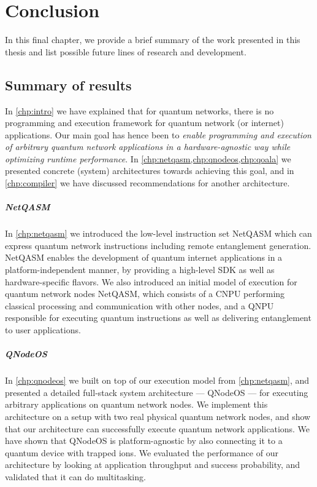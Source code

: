 \chapter{Conclusion}
\label{chp:conclusion}

In this final chapter, we provide a brief summary of the work presented in this thesis and list possible future lines of research and development.

\section{Summary of results}
In \cref{chp:intro} we have explained that for quantum networks, there is no programming and execution framework for quantum network (or internet) applications.
Our main goal has hence been to \emph{enable programming and execution of arbitrary quantum network applications in a hardware-agnostic way while optimizing runtime performance}.
In \cref{chp:netqasm,chp:qnodeos,chp:qoala} we presented concrete (system) architectures towards achieving this goal, and in \cref{chp:compiler} we have discussed recommendations for another architecture.


\paragraph{NetQASM}
In \cref{chp:netqasm} we introduced the low-level instruction set \ac{NetQASM} which can express quantum network instructions including remote entanglement generation.
\ac{NetQASM} enables the development of quantum internet applications in a platform-independent manner, by providing a high-level SDK as well as hardware-specific flavors.
We also introduced an initial model of execution for quantum network nodes \ac{NetQASM}, which consists of a \ac{CNPU} performing classical processing and communication with other nodes, and a \ac{QNPU} responsible for executing quantum instructions as well as delivering entanglement to user applications.


\paragraph{QNodeOS}

In \cref{chp:qnodeos} we built on top of our execution model from \cref{chp:netqasm}, and presented a detailed full-stack system architecture --- QNodeOS --- for executing arbitrary applications on quantum network nodes.
We implement this architecture on a setup with two real physical quantum network nodes, and show that our architecture can successfully execute quantum network applications.
We have shown that \ac{QNodeOS} is platform-agnostic by also connecting it to a quantum device with trapped ions.
We evaluated the performance of our architecture by looking at application throughput and success probability, and validated that it can do multitasking.

